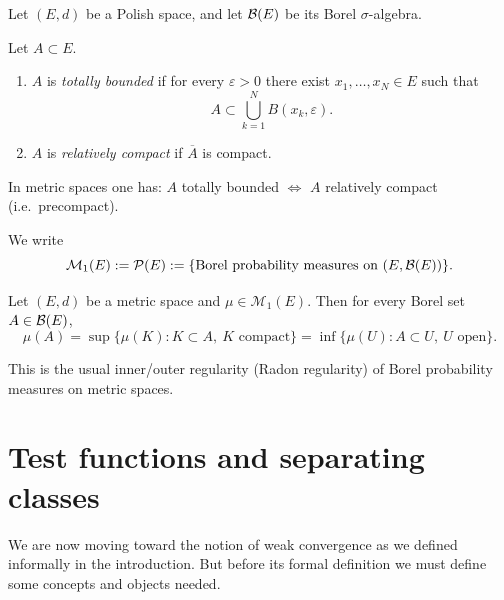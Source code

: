Let $(E,d)$ be a Polish space, and let $\mathcal{B}(E)$ be its Borel $\sigma$-algebra. 

\begin{definition}
Let $A\subset E$.
\begin{enumerate}[label=(\alph*)]
\item $A$ is \emph{totally bounded} if for every $\varepsilon>0$ there exist $x_1,\dots,x_N\in E$ such that
\[
A\subset \bigcup_{k=1}^N B(x_k,\varepsilon).
\]
\item $A$ is \emph{relatively compact} if $\overline{A}$ is compact.
\end{enumerate}
\end{definition}

\begin{remark}
In metric spaces one has: $A$ totally bounded $\Longleftrightarrow$ $A$ relatively compact (i.e.\ precompact).
\end{remark}

\begin{definition}
We write
\[
\mathcal{M}_1(E):=\mathcal{P}(E):=\{\text{Borel probability measures on }(E,\mathcal{B}(E))\}.
\]
\end{definition}

\begin{proposition}[Regularity]
Let $(E,d)$ be a metric space and $\mu\in\mathcal{M}_1(E)$. Then for every Borel set $A\in\mathcal{B}(E)$,
\[
\mu(A)=\sup\{\mu(K): K\subset A,\ K \text{ compact}\}
=\inf\{\mu(U): A\subset U,\ U \text{ open}\}.
\]
\end{proposition}

\begin{remark}
This is the usual inner/outer regularity (Radon regularity) of Borel probability measures on metric spaces.
\end{remark}

\section{Test functions and separating classes}


We are now moving toward the notion of weak convergence as we defined informally in the introduction. But before its formal definition we must define some concepts and objects needed.

